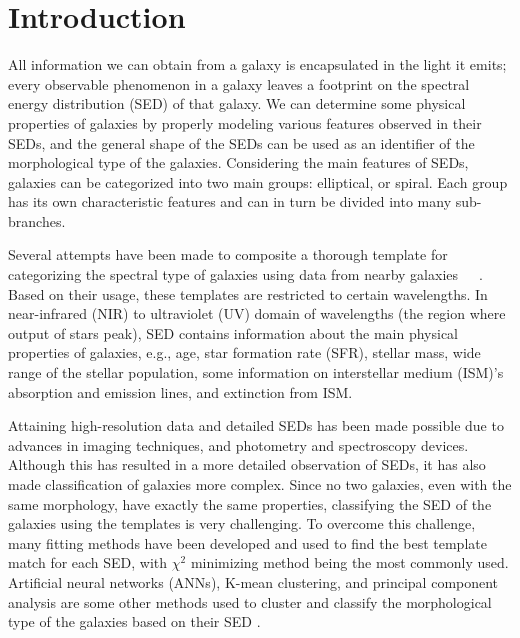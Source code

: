 \section{Introduction}
\label{sec: intro}
All information we can obtain from a galaxy is encapsulated in the light it emits; every observable phenomenon in a galaxy leaves a footprint on the spectral energy distribution (SED) of that galaxy.
We can determine some physical properties of galaxies by properly modeling various features observed in their SEDs, and the general shape of the SEDs can be used as an identifier of the morphological type of the galaxies.
Considering the main features of SEDs, galaxies can be categorized into two main groups: elliptical, or spiral.
Each group has its own characteristic features and can in turn be divided into many sub-branches.

Several attempts have been made to composite a thorough template for categorizing the spectral type of galaxies using data from nearby galaxies~\citep[e.g.][]{Kinney93}~\citep[][hereafter K96]{Kinney96}~\citep[][]{Bershady00,Mannucci01}. 
Based on their usage, these templates are restricted to certain wavelengths.
In near-infrared (NIR) to ultraviolet (UV) domain of wavelengths (the region where output of stars peak), SED contains information about the main physical properties of galaxies, e.g., age, star formation rate (SFR), stellar mass, wide range of the stellar population, some information on interstellar medium (ISM)'s absorption and emission lines, and extinction from ISM.



Attaining high-resolution data and detailed SEDs has been made possible due to advances in imaging techniques, and photometry and spectroscopy devices.
Although this has resulted in a more detailed observation of SEDs, it has also made classification of galaxies more complex.
Since no two galaxies, even with the same morphology, have exactly the same properties, classifying the SED of the galaxies using the templates is very challenging.
To overcome this challenge, many fitting methods have been developed and used to find the best template match for each SED, with $\chi^2$ minimizing method being the most commonly used. 
Artificial neural networks (ANNs), K-mean clustering, and principal component analysis are some other methods used to cluster and classify the morphological type of the galaxies based on their SED \citep[e.g.][]{Allen13,Ordov14,Shi15}.

